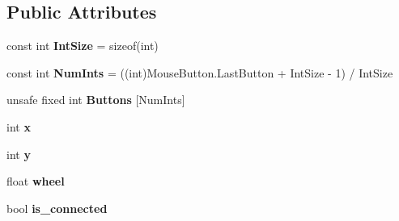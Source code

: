 \subsection*{Public Attributes}
\begin{DoxyCompactItemize}
\item 
\hypertarget{struct_open_t_k_1_1_input_1_1_mouse_state_a79f3097329f8415900c939c663a0d73e}{const int {\bfseries Int\-Size} = sizeof(int)}\label{struct_open_t_k_1_1_input_1_1_mouse_state_a79f3097329f8415900c939c663a0d73e}

\item 
\hypertarget{struct_open_t_k_1_1_input_1_1_mouse_state_aefd1e3045049a846615a6951be8742a5}{const int {\bfseries Num\-Ints} = ((int)Mouse\-Button.\-Last\-Button + Int\-Size -\/ 1) / Int\-Size}\label{struct_open_t_k_1_1_input_1_1_mouse_state_aefd1e3045049a846615a6951be8742a5}

\item 
\hypertarget{struct_open_t_k_1_1_input_1_1_mouse_state_a7fc4a7e96b7a8c11724e5d490111e663}{unsafe fixed int {\bfseries Buttons} \mbox{[}Num\-Ints\mbox{]}}\label{struct_open_t_k_1_1_input_1_1_mouse_state_a7fc4a7e96b7a8c11724e5d490111e663}

\item 
\hypertarget{struct_open_t_k_1_1_input_1_1_mouse_state_a1c2dc651b6cfe4e05470933213252490}{int {\bfseries x}}\label{struct_open_t_k_1_1_input_1_1_mouse_state_a1c2dc651b6cfe4e05470933213252490}

\item 
\hypertarget{struct_open_t_k_1_1_input_1_1_mouse_state_a4d42c0dd0d0d59d4e605be9decf18004}{int {\bfseries y}}\label{struct_open_t_k_1_1_input_1_1_mouse_state_a4d42c0dd0d0d59d4e605be9decf18004}

\item 
\hypertarget{struct_open_t_k_1_1_input_1_1_mouse_state_a4065e654de260c1d02ccf78f347f1869}{float {\bfseries wheel}}\label{struct_open_t_k_1_1_input_1_1_mouse_state_a4065e654de260c1d02ccf78f347f1869}

\item 
\hypertarget{struct_open_t_k_1_1_input_1_1_mouse_state_a13563f19fae99086cd7b83fadaa55045}{bool {\bfseries is\-\_\-connected}}\label{struct_open_t_k_1_1_input_1_1_mouse_state_a13563f19fae99086cd7b83fadaa55045}

\end{DoxyCompactItemize}
